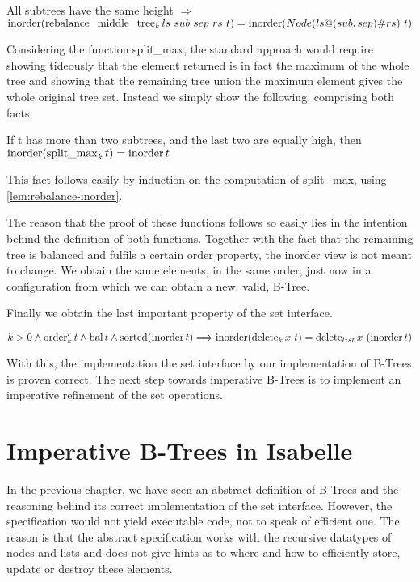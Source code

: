 \begin{lemma}
    \label{lem:rebalance-inorder}
    All subtrees have the same height $\Longrightarrow$ \\
    $\operatorname{inorder} (\operatorname{rebalance\_middle\_tree}_k ls\ sub\ sep\ rs\ t) = \operatorname{inorder} (Node (ls@(sub,sep)\#rs)\ t)$
\end{lemma}

Considering the function split\_max,
the standard approach would require showing
tideously that the element returned is in fact the maximum of the whole tree
and showing that the remaining tree union the maximum element
gives the whole original tree set.
Instead we simply show the following,
comprising both facts:

\begin{lemma}
    \label{lem:splitmax-inorder}
    If t has more than two subtrees, and the last two are equally high, then
    $\operatorname{inorder} (\operatorname{split\_max}_k t) = \operatorname{inorder} t$
\end{lemma}

This fact follows easily by induction on the computation of split\_max,
using \autoref{lem:rebalance-inorder}.

The reason that the proof of these functions follows so easily
lies in the intention behind the definition of both functions.
Together with the fact that the remaining tree is balanced and
fulfils a certain order property, the inorder view
is not meant to change.
We obtain the same elements, in the same order,
just now in a configuration from which we can obtain
a new, valid, B-Tree.

Finally we obtain the last important property of the set interface.
\begin{theorem}
    $k > 0 \wedge \operatorname{order}^r_k t \wedge \operatorname{bal} t \wedge \operatorname{sorted}  (\operatorname{inorder} t)\Longrightarrow
    \operatorname{inorder} (\operatorname{delete}_k x\ t) = \operatorname{delete}_{list} x\ (\operatorname{inorder} t)$
\end{theorem}

With this, the implementation the set interface by
our implementation of B-Trees is proven correct.
The next step towards imperative B-Trees is to implement
an imperative refinement of the set operations.

\chapter{Imperative B-Trees in Isabelle}\label{chapter:imp-set}

In the previous chapter, we have seen
an abstract definition of B-Trees and the reasoning
behind its correct implementation of the set interface.
However, the specification would not yield executable
code, not to speak of efficient one.
The reason is that the abstract specification works with
the recursive datatypes of nodes and lists
and does not give hints as to where and how to
efficiently store, update or destroy these elements.

